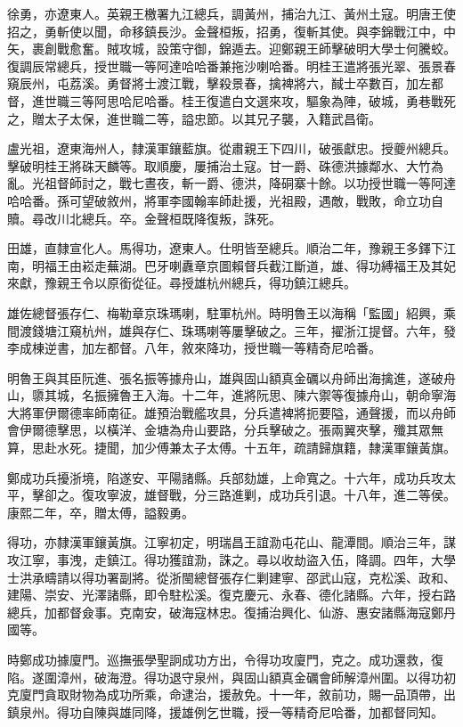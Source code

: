 \begin{pinyinscope}
徐勇，亦遼東人。英親王檄署九江總兵，調黃州，捕治九江、黃州土寇。明唐王使招之，勇斬使以聞，命移鎮長沙。金聲桓叛，招勇，復斬其使。與李錦戰江中，中矢，裹創戰愈奮。賊攻城，設策守御，錦遁去。迎鄭親王師擊破明大學士何騰蛟。復調辰常總兵，授世職一等阿達哈哈番兼拖沙喇哈番。明桂王遣將張光翠、張景春窺辰州，屯荔溪。勇督將士渡江戰，擊殺景春，擒裨將六，馘士卒數百，加左都督，進世職三等阿思哈尼哈番。桂王復遣白文選來攻，驅象為陣，破城，勇巷戰死之，贈太子太保，進世職二等，謚忠節。以其兄子襲，入籍武昌衛。

盧光祖，遼東海州人，隸漢軍鑲藍旗。從肅親王下四川，破張獻忠。授夔州總兵。擊破明桂王將硃天麟等。取順慶，屢捕治土寇。甘一爵、硃德洪據鄰水、大竹為亂。光祖督師討之，戰七晝夜，斬一爵、德洪，降硐寨十餘。以功授世職一等阿達哈哈番。孫可望破敘州，將軍李國翰率師赴援，光祖殿，遇敵，戰敗，命立功自贖。尋改川北總兵。卒。金聲桓既降復叛，誅死。

田雄，直隸宣化人。馬得功，遼東人。仕明皆至總兵。順治二年，豫親王多鐸下江南，明福王由崧走蕪湖。巴牙喇纛章京圖賴督兵截江斷道，雄、得功縛福王及其妃來獻，豫親王令以原銜從征。尋授雄杭州總兵，得功鎮江總兵。

雄佐總督張存仁、梅勒章京珠瑪喇，駐軍杭州。時明魯王以海稱「監國」紹興，乘間渡錢塘江窺杭州，雄與存仁、珠瑪喇等屢擊破之。三年，擢浙江提督。六年，發李成棟逆書，加左都督。八年，敘來降功，授世職一等精奇尼哈番。

明魯王與其臣阮進、張名振等據舟山，雄與固山額真金礪以舟師出海擒進，遂破舟山，隳其城，名振擁魯王入海。十二年，進將阮思、陳六禦等復據舟山，朝命寧海大將軍伊爾德率師南征。雄預治戰艦攻具，分兵遣裨將扼要隘，通聲援，而以舟師會伊爾德擊思，以橫洋、金塘為舟山要路，分兵擊破之。張兩翼夾擊，殲其眾無算，思赴水死。捷聞，加少傅兼太子太傅。十五年，疏請歸旗籍，隸漢軍鑲黃旗。

鄭成功兵擾浙境，陷遂安、平陽諸縣。兵部劾雄，上命寬之。十六年，成功兵攻太平，擊卻之。復攻寧波，雄督戰，分三路進剿，成功兵引退。十八年，進二等侯。康熙二年，卒，贈太傅，謚毅勇。

得功，亦隸漢軍鑲黃旗。江寧初定，明瑞昌王誼泐屯花山、龍潭間。順治三年，謀攻江寧，事洩，走鎮江。得功獲誼泐，誅之。尋以收劫盜入伍，降調。四年，大學士洪承疇請以得功署副將。從浙閩總督張存仁剿建寧、邵武山寇，克松溪、政和、建陽、崇安、光澤諸縣，即令駐松溪。復克慶元、永春、德化諸縣。六年，授右路總兵，加都督僉事。克南安，破海寇林忠。復捕治興化、仙游、惠安諸縣海寇鄭丹國等。

時鄭成功據廈門。巡撫張學聖詗成功方出，令得功攻廈門，克之。成功還救，復陷。遂圍漳州，破海澄。得功退守泉州，與固山額真金礪會師解漳州圍。以得功初克廈門貪取財物為成功所乘，命逮治，援赦免。十一年，敘前功，賜一品頂帶，出鎮泉州。得功自陳與雄同降，援雄例乞世職，授一等精奇尼哈番，加都督同知。


\end{pinyinscope}
